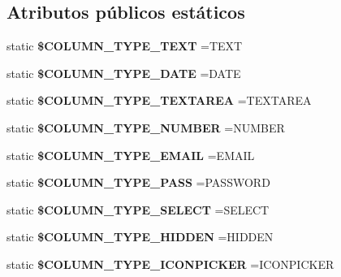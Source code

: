 \subsection*{Atributos públicos estáticos}
\begin{DoxyCompactItemize}
\item 
\mbox{\label{class_column_add0278cf87eb60e6e0210c5cc21f03cd}} 
static {\bfseries \$\+C\+O\+L\+U\+M\+N\+\_\+\+T\+Y\+P\+E\+\_\+\+T\+E\+XT} =\textquotesingle{}T\+E\+XT\textquotesingle{}
\item 
\mbox{\label{class_column_a2754b6343815916ea88de26168059f5d}} 
static {\bfseries \$\+C\+O\+L\+U\+M\+N\+\_\+\+T\+Y\+P\+E\+\_\+\+D\+A\+TE} =\textquotesingle{}D\+A\+TE\textquotesingle{}
\item 
\mbox{\label{class_column_afbb8b11821a0eb8c14152fdb176629e7}} 
static {\bfseries \$\+C\+O\+L\+U\+M\+N\+\_\+\+T\+Y\+P\+E\+\_\+\+T\+E\+X\+T\+A\+R\+EA} =\textquotesingle{}T\+E\+X\+T\+A\+R\+EA\textquotesingle{}
\item 
\mbox{\label{class_column_a0ff7d7a26e7c23e732b17c3b94c6049c}} 
static {\bfseries \$\+C\+O\+L\+U\+M\+N\+\_\+\+T\+Y\+P\+E\+\_\+\+N\+U\+M\+B\+ER} =\textquotesingle{}N\+U\+M\+B\+ER\textquotesingle{}
\item 
\mbox{\label{class_column_a4738c71bb7bee84e41d312eeb83ba5df}} 
static {\bfseries \$\+C\+O\+L\+U\+M\+N\+\_\+\+T\+Y\+P\+E\+\_\+\+E\+M\+A\+IL} =\textquotesingle{}E\+M\+A\+IL\textquotesingle{}
\item 
\mbox{\label{class_column_a526619c15537b72aff302c35227158be}} 
static {\bfseries \$\+C\+O\+L\+U\+M\+N\+\_\+\+T\+Y\+P\+E\+\_\+\+P\+A\+SS} =\textquotesingle{}P\+A\+S\+S\+W\+O\+RD\textquotesingle{}
\item 
\mbox{\label{class_column_a128acea2ffdb29e3354ef4ac1bd40935}} 
static {\bfseries \$\+C\+O\+L\+U\+M\+N\+\_\+\+T\+Y\+P\+E\+\_\+\+S\+E\+L\+E\+CT} =\textquotesingle{}S\+E\+L\+E\+CT\textquotesingle{}
\item 
\mbox{\label{class_column_a67c9287a9ccfa3919bcd2758c3ac28c3}} 
static {\bfseries \$\+C\+O\+L\+U\+M\+N\+\_\+\+T\+Y\+P\+E\+\_\+\+H\+I\+D\+D\+EN} =\textquotesingle{}H\+I\+D\+D\+EN\textquotesingle{}
\item 
\mbox{\label{class_column_a9b71f3ee112b7de47aac0c9eac12d32b}} 
static {\bfseries \$\+C\+O\+L\+U\+M\+N\+\_\+\+T\+Y\+P\+E\+\_\+\+I\+C\+O\+N\+P\+I\+C\+K\+ER} =\textquotesingle{}I\+C\+O\+N\+P\+I\+C\+K\+ER\textquotesingle{}
\end{DoxyCompactItemize}



